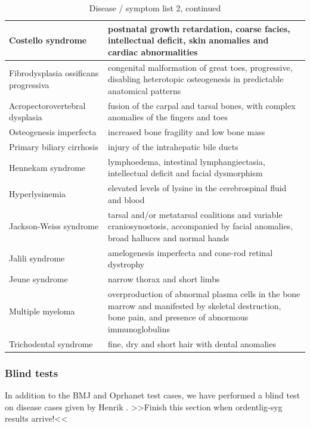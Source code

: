 \begin{table}[H]
\caption{Disease / symptom list 2, continued}
\label{OrphanetCases2}
\begin{tabular}{| p{6.5cm} | p{6.5cm}|}
\hline
Costello syndrome & postnatal growth retardation, coarse facies, intellectual deficit, skin anomalies and cardiac abnormalities \\
\hline
Fibrodysplasia ossificans progressiva & congenital malformation of great toes, progressive, disabling heterotopic osteogenesis in predictable anatomical patterns \\
\hline
Acropectorovertebral dysplasia & fusion of the carpal and tarsal bones, with complex anomalies of the fingers and toes \\
\hline
Osteogenesis imperfecta & increased bone fragility and low bone mass \\
\hline
Primary biliary cirrhosis & injury of the intrahepatic bile ducts \\
\hline
Hennekam syndrome & lymphoedema, intestinal lymphangiectasia, intellectual deficit and facial dysmorphism \\
\hline
Hyperlysinemia & elevated levels of lysine in the cerebrospinal fluid and blood \\
\hline
Jackson-Weiss syndrome & tarsal and/or metatarsal coalitions and variable craniosynostosis, accompanied by facial anomalies, broad halluces and normal hands \\
\hline
Jalili syndrome & amelogenesis imperfecta and cone-rod retinal dystrophy \\
\hline
Jeune syndrome & narrow thorax and short limbs \\
\hline
Multiple myeloma & overproduction of abnormal plasma cells in the bone marrow and manifested by skeletal destruction, bone pain, and presence of abnormous immunoglobulins \\
\hline
Trichodental syndrome & fine, dry and short hair with dental anomalies \\
\hline
\end{tabular}
\end{table}

\subsubsection{Blind tests}
In addition to the BMJ and Oprhanet test cases, we have performed a
blind test on disease cases given by Henrik \cite{TheDude}.  >>Finish
this section when ordentlig-syg results arrive!<<

